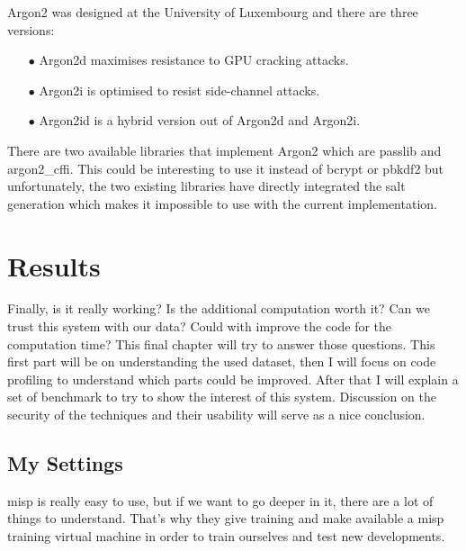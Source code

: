 \documentclass{eplmastersthesis}
\begin{document}
Argon2 was designed at the University of Luxembourg and there are three versions:
\begin{itemize}
\item[$\bullet$] Argon2d maximises resistance to GPU cracking attacks.
\item[$\bullet$] Argon2i is optimised to resist side-channel attacks.
\item[$\bullet$] Argon2id is a hybrid version out of Argon2d and Argon2i.
\end{itemize}

There are two available libraries that implement Argon2 which are passlib and argon2\_cffi.
This could be interesting to use it instead of bcrypt or \gls{pbkdf2} but unfortunately, the two existing libraries have directly integrated the salt generation which makes it impossible to use with the current implementation. \\

\chapter{Results}
Finally, is it really working? Is the additional computation worth it? Can we trust this system with our data? Could with improve the code for the computation time?
This final chapter will try to answer those questions.
This first part will be on understanding the used dataset, then I will focus on code profiling to understand which parts could be improved.
After that I will explain a set of benchmark to try to show the interest of this system.
Discussion on the security of the techniques and their usability will serve as a nice conclusion.\\


\section{My Settings}

\gls{misp} is really easy to use, but if we want to go deeper in it, there are a lot of things to understand. That's why they give training and make available a \gls{misp} training virtual machine in order to train ourselves and test new developments.\\
\end{document}
